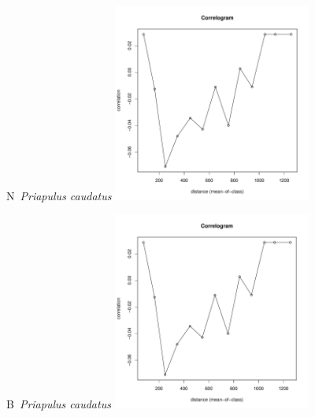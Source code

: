 \documentclass[12pt, a4paper]{disser}
\begin{document}
	\begin{figure}[h]

	\begin{minipage}[b]{.46\linewidth}
	\begin{center}
	{\small N~{\it Priapulus caudatus}}
		\includegraphics[width=65mm]{../Barenc_Sea/distribution_Moran/Plyazh081_moran_N_Priapulus_caudatus_.pdf}
	\end{center}
	\end{minipage}
%
	\hfil %
%
	\begin{minipage}[b]{.46\linewidth}
	\begin{center}
	{\small B~{\it Priapulus caudatus}}
		\includegraphics[width=65mm]{../Barenc_Sea/distribution_Moran/Plyazh081_moran_B_Priapulus_caudatus_.pdf}
	\end{center}
	\end{minipage}


\end{figure}
\end{document}
